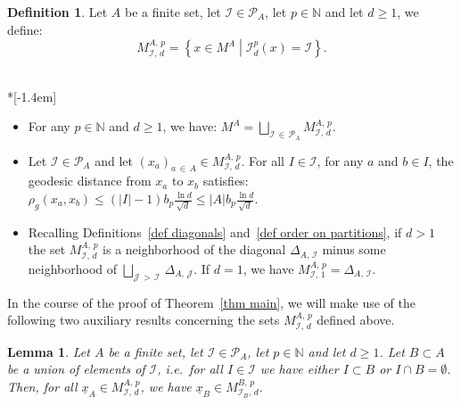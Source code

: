 \documentclass[10pt]{amsart}
\newtheorem{lemm}[theo]{Lemma}\newtheorem{prop}[theo]{Proposition}\newtheorem{coro}[theo]{Corollary}\newtheorem{conj}[theo]{Conjecture}
\theoremstyle{definition}\newtheorem{defi}[theo]{Definition}\newtheorem{rema}[theo]{Remark}\newtheorem{exam}[theo]{Example}\newtheorem{exem}[theo]{Example}\newtheorem{nota}[theo]{Notation}
\newcommand{\I}{\mathcal{I}}
\newcommand{\J}{\mathcal{J}}
\newcommand{\pa}{\mathcal{P}\!}
\newcommand{\N}{\mathbb{N}}
\newcommand{\mvert}{\mathrel{}\middle|\mathrel{}}
\newcommand{\norm}[1]{\left\lvert #1 \right\rvert}
\renewcommand{\geq}{\geqslant}
\renewcommand{\leq}{\leqslant}
\begin{document}
\begin{defi}\label{def M AIdp}
Let $A$ be a finite set, let $\I \in \pa_A$, let $p \in \N$ and let $d \geq 1$, we define:
\[
M^{A,\,p}_{\I,\,d} = \left\{ x \in M^A \mvert \I^p_d(x) = \I \right\}.
\]
\end{defi}
\pagebreak
\begin{remas}\label{rem M AIdp}\ \\*[-1.4em]
\begin{itemize}
\item For any $p \in \N$ and $d \geq 1$, we have: $M^A = \bigsqcup_{\I\,\in\,\pa_A} M^{A,\,p}_{\I,\,d}$.
\item Let $\I \in \pa_A$ and let $(x_a)_{a\,\in\,A} \in M^{A,\,p}_{\I,\,d}$. For all $I \in \I$, for any $a$ and $b \in I$, the geodesic distance from $x_a$ to $x_b$ satisfies: $\rho_g(x_a,x_b) \leq (\norm{I}-1) b_p\tfrac{\ln d}{\sqrt{d}} \leq |A| b_p\tfrac{\ln d}{\sqrt{d}}$.
\item Recalling Definitions~\ref{def diagonals} and~\ref{def order on partitions}, if $d >1$ the set $M^{A,\,p}_{\I,\,d}$ is a neighborhood of the diagonal $\Delta_{A,\,\I}$ minus some neighborhood of $\bigsqcup_{\J\,>\,\I}\,\Delta_{A,\,\J}$. If $d=1$, we have $M^{A,\,p}_{\I,\,1}=\Delta_{A,\,\I}$.
\end{itemize}
\end{remas}

In the course of the proof of Theorem~\ref{thm main}, we will make use of the following two auxiliary results concerning the sets $M^{A,\,p}_{\I,\,d}$ defined above.

\begin{lemm}\label{lem M AIdp restricted}
Let $A$ be a finite set, let $\I \in \pa_A$, let $p \in \N$ and let $d \geq 1$. Let $B \subset A$ be a union of elements of $\I$, i.e.~for all $I \in \I$ we have either $I \subset B$ or $I \cap B = \emptyset$. Then, for all $\underline{x}_A \in M^{A,\,p}_{\I,\,d}$, we have $\underline{x}_B \in M^{B,\,p}_{\I_B,\,d}$.
\end{lemm}
\end{document}
